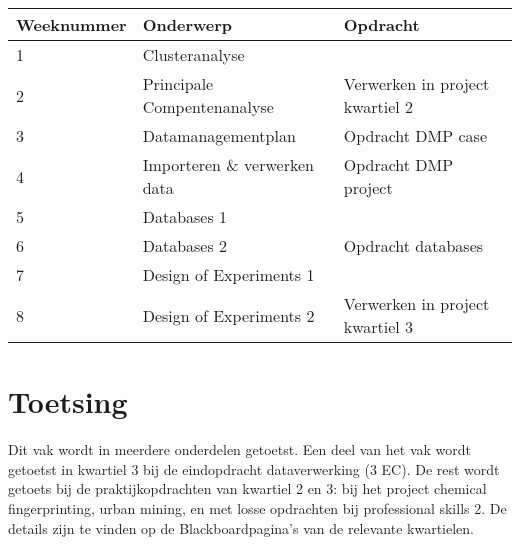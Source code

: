 \begin{table}[h]
\begin{tabular}{|l|l|l|}
\hline
\rowcolor[HTML]{009C82} 
Weeknummer & Onderwerp                    & Opdracht                         \\ \hline
1          & Clusteranalyse               &                                  \\ \hline
2          & Principale Compentenanalyse  & Verwerken in project kwartiel 2 \\ \hline
\rowcolor[HTML]{C0C0C0} 
3          & Datamanagementplan           & Opdracht DMP case                                  \\ \hline
\rowcolor[HTML]{C0C0C0} 
4          & Importeren \& verwerken data & Opdracht DMP project             \\ \hline
5          & Databases 1                  &                                  \\ \hline
6          & Databases 2                  & Opdracht databases               \\ \hline
\rowcolor[HTML]{C0C0C0} 
7          & Design of Experiments 1      &                                  \\ \hline
\rowcolor[HTML]{C0C0C0} 
8          & Design of Experiments 2      & Verwerken in project kwartiel 3 \\ \hline
\end{tabular}
\end{table}


\section{Toetsing}

Dit vak wordt in meerdere onderdelen getoetst. Een deel van het vak wordt getoetst in kwartiel 3 bij de eindopdracht dataverwerking (3 EC). De rest wordt getoets bij de praktijkopdrachten van kwartiel 2 en 3: bij het project chemical fingerprinting, urban mining, en met losse opdrachten bij professional skills 2. De details zijn te vinden op de Blackboardpagina's van de relevante kwartielen. 